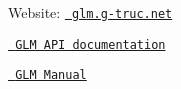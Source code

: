 
\begin{DoxyItemize}
\item Website\+: \href{https://glm.g-truc.net}{\texttt{ glm.\+g-\/truc.\+net}}
\item \href{modules.html}{\texttt{ GLM API documentation}}
\item \href{https://github.com/g-truc/glm/blob/master/manual.md}{\texttt{ GLM Manual}} 
\end{DoxyItemize}